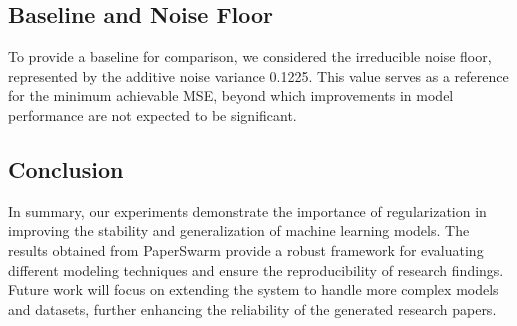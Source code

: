 \subsection{Baseline and Noise Floor}

To provide a baseline for comparison, we considered the irreducible noise floor, represented by the additive noise variance 0.1225. This value serves as a reference for the minimum achievable MSE, beyond which improvements in model performance are not expected to be significant.

\subsection{Conclusion}

In summary, our experiments demonstrate the importance of regularization in improving the stability and generalization of machine learning models. The results obtained from PaperSwarm provide a robust framework for evaluating different modeling techniques and ensure the reproducibility of research findings. Future work will focus on extending the system to handle more complex models and datasets, further enhancing the reliability of the generated research papers.
